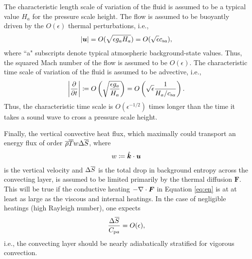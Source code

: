 \documentclass[12pt]{article}
\newcommand{\vecf}{\bm{F}}
\newcommand{\veck}{\hat{\bm{k}}}
\begin{document}
	The characteristic length scale of variation of the fluid is assumed to be a typical value $H_a$ for the pressure scale height. The flow is assumed to be buoyantly driven by the $O(\epsilon)$ thermal perturbations, i.e., 
	\begin{align}\label{eq:scaleu}
		|\bm{u}| = O(\sqrt{\epsilon g_a H_a}) = O(\sqrt{\epsilon}c_{{\rm s}a}),
	\end{align}
	where ``a" subscripts denote typical atmospheric background-state values. Thus, the squared Mach number of the flow is assumed to be $O(\epsilon)$. The characteristic time scale of variation of the fluid is assumed to be advective, i.e., 
	\begin{align}\label{eq:scaleu}
	\left|\frac{\partial}{\partial t}\right|  \coloneqq O\left(\sqrt{\frac{\epsilon g_a}{H_a}}\right) = O\left(\sqrt{\epsilon} \frac{1}{H_a/c_{{\rm s}a}}\right).
	\end{align}
	Thus, the characteristic time scale is $O(\epsilon^{-1/2})$ times longer than the time it takes a sound wave to cross a pressure scale height. 
	
	Finally, the vertical convective heat flux, which maximally could transport an energy flux of order $\overline{\rho} \overline{T} w \Delta\overline{S}$, where 
	\begin{align}\label{eq:defw}
		w\define\veck\cdot\vecu
	\end{align} is the vertical velocity and $\Delta \overline{S} $ is the total drop in background entropy across the convecting layer, is assumed to be limited primarily by the thermal diffusion $\vecf$. This will be true if the conductive heating $-\Div \vecf$ in Equation \eqref{eq:en} is at at least as large as the viscous and internal heatings. In the case of negligible heatings (high Rayleigh number), one expects
	\begin{align}
		\frac{\Delta\overline{S}}{C_{{\rm p}a}} = O(\epsilon),
	\end{align}
	i.e., the convecting layer should be nearly adiabatically stratified for vigorous convection. 
	
\end{document}
